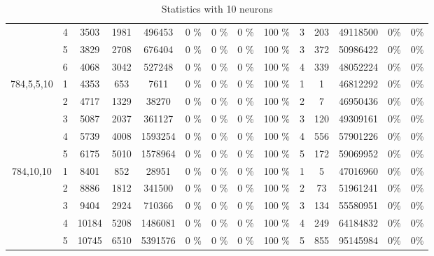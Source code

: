 \begin{table} [!ht]
\begin{tabular}{ ||c||c|c|c|c|c|c|c|c|c|c|c|c|c| }
& 4 & 3503 & 1981 & 496453 & 0 \% & 0 \% & 0 \% & 100 \% & 3 & 203 & 49118500 & 0\% & 0\% \\ 
& 5 & 3829 & 2708 & 676404 & 0 \% & 0 \% & 0 \% & 100 \% & 3 & 372 & 50986422 & 0\% & 0\% \\ 
& 6 & 4068 & 3042 & 527248 & 0 \% & 0 \% & 0 \% & 100 \% & 4 & 339 & 48052224 & 0\% & 0\% \\ 
\hline \hline
\multirow{5}{4em}{784,5,5,10}
& 1 & 4353 & 653 & 7611 & 0 \% & 0 \% & 0 \% & 100 \% & 1 & 1 & 46812292 & 0\% & 0\% \\ 
& 2 & 4717 & 1329 & 38270 & 0 \% & 0 \% & 0 \% & 100 \% & 2 & 7 & 46950436 & 0\% & 0\% \\ 
& 3 & 5087 & 2037 & 361127 & 0 \% & 0 \% & 0 \% & 100 \% & 3 & 120 & 49309161 & 0\% & 0\% \\ 
& 4 & 5739 & 4008 & 1593254 & 0 \% & 0 \% & 0 \% & 100 \% & 4 & 556 & 57901226 & 0\% & 0\% \\ 
& 5 & 6175 & 5010 & 1578964 & 0 \% & 0 \% & 0 \% & 100 \% & 5 & 172 & 59069952 & 0\% & 0\% \\ 
\hline \hline
\multirow{5}{4em}{784,10,10}
& 1 & 8401 & 852 & 28951 & 0 \% & 0 \% & 0 \% & 100 \% & 1 & 5 & 47016960 & 0\% & 0\% \\ 
& 2 & 8886 & 1812 & 341500 & 0 \% & 0 \% & 0 \% & 100 \% & 2 & 73 & 51961241 & 0\% & 0\% \\ 
& 3 & 9404 & 2924 & 710366 & 0 \% & 0 \% & 0 \% & 100 \% & 3 & 134 & 55580951 & 0\% & 0\% \\ 
& 4 & 10184 & 5208 & 1486081 & 0 \% & 0 \% & 0 \% & 100 \% & 4 & 249 & 64184832 & 0\% & 0\% \\ 
& 5 & 10745 & 6510 & 5391576 & 0 \% & 0 \% & 0 \% & 100 \% & 5 & 855 & 95145984 & 0\% & 0\% \\ 
\hline \hline
\end{tabular} \caption{Statistics with 10 neurons}\label{tab:10N-E1} \end{table}
